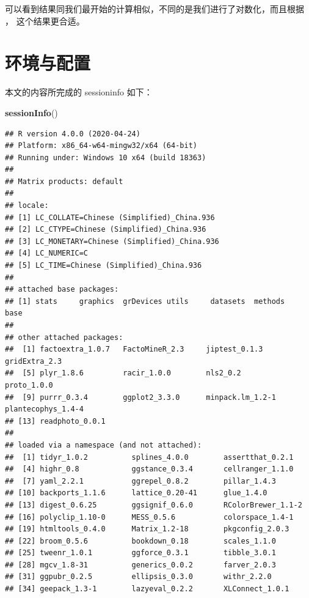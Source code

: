 \documentclass[
]{krantz}
\makeatletter
\newenvironment{Shaded}{\begin{snugshade}}{\end{snugshade}}
\newcommand{\KeywordTok}[1]{\textcolor[rgb]{0.13,0.29,0.53}{\textbf{#1}}}
\newcommand{\NormalTok}[1]{#1}
\newenvironment{kframe}{%
\medskip{}
\setlength{\fboxsep}{.8em}
 \def\at@end@of@kframe{}%
 \ifinner\ifhmode%
  \def\at@end@of@kframe{\end{minipage}}%
  \begin{minipage}{\columnwidth}%
 \fi\fi%
 \def\FrameCommand##1{\hskip\@totalleftmargin \hskip-\fboxsep
 \colorbox{shadecolor}{##1}\hskip-\fboxsep
     \hskip-\linewidth \hskip-\@totalleftmargin \hskip\columnwidth}%
 \MakeFramed {\advance\hsize-\width
   \@totalleftmargin\z@ \linewidth\hsize
   \@setminipage}}%
 {\par\unskip\endMakeFramed%
 \at@end@of@kframe}
\renewenvironment{Shaded}{\begin{kframe}}{\end{kframe}}
\makeatother
\begin{document}
可以看到结果同我们最开始的计算相似，不同的是我们进行了对数化，而且根据 \citet{kemp2003modern}， 这个结果更合适。

\hypertarget{sessioninfo}{%
\chapter{环境与配置}\label{sessioninfo}}

本文的内容所完成的 sessioninfo 如下：

\begin{Shaded}
\begin{Highlighting}[]
\KeywordTok{sessionInfo}\NormalTok{()}
\end{Highlighting}
\end{Shaded}

\begin{verbatim}
## R version 4.0.0 (2020-04-24)
## Platform: x86_64-w64-mingw32/x64 (64-bit)
## Running under: Windows 10 x64 (build 18363)
## 
## Matrix products: default
## 
## locale:
## [1] LC_COLLATE=Chinese (Simplified)_China.936 
## [2] LC_CTYPE=Chinese (Simplified)_China.936   
## [3] LC_MONETARY=Chinese (Simplified)_China.936
## [4] LC_NUMERIC=C                              
## [5] LC_TIME=Chinese (Simplified)_China.936    
## 
## attached base packages:
## [1] stats     graphics  grDevices utils     datasets  methods   base     
## 
## other attached packages:
##  [1] factoextra_1.0.7   FactoMineR_2.3     jiptest_0.1.3      gridExtra_2.3     
##  [5] plyr_1.8.6         racir_1.0.0        nls2_0.2           proto_1.0.0       
##  [9] purrr_0.3.4        ggplot2_3.3.0      minpack.lm_1.2-1   plantecophys_1.4-4
## [13] readphoto_0.0.1   
## 
## loaded via a namespace (and not attached):
##  [1] tidyr_1.0.2          splines_4.0.0        assertthat_0.2.1    
##  [4] highr_0.8            ggstance_0.3.4       cellranger_1.1.0    
##  [7] yaml_2.2.1           ggrepel_0.8.2        pillar_1.4.3        
## [10] backports_1.1.6      lattice_0.20-41      glue_1.4.0          
## [13] digest_0.6.25        ggsignif_0.6.0       RColorBrewer_1.1-2  
## [16] polyclip_1.10-0      MESS_0.5.6           colorspace_1.4-1    
## [19] htmltools_0.4.0      Matrix_1.2-18        pkgconfig_2.0.3     
## [22] broom_0.5.6          bookdown_0.18        scales_1.1.0        
## [25] tweenr_1.0.1         ggforce_0.3.1        tibble_3.0.1        
## [28] mgcv_1.8-31          generics_0.0.2       farver_2.0.3        
## [31] ggpubr_0.2.5         ellipsis_0.3.0       withr_2.2.0         
## [34] geepack_1.3-1        lazyeval_0.2.2       XLConnect_1.0.1     

\end{verbatim}
\end{document}
